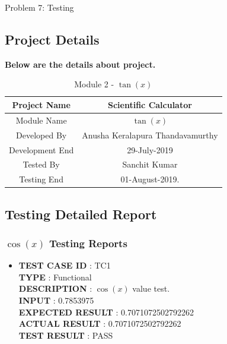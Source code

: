 \documentclass[a4paper,12pt]{article}
\begin{document}
\newpage
\begin{section}{Problem 7: Testing}

\subsection{Project Details}
\textbf{Below are the details about project.}
\renewcommand{\arraystretch}{1.5}
\begin{table}[htp]
	\centering
	\caption{Module 2 - $\tan(x)$} \vspace{0.5cm} \label{tab:definition_table} 
	\begin{tabular}{||c|c||}
		\hline \hline 
		\LARGE Project Name & \LARGE Scientific Calculator  \\ 
		\hline
		\LARGE Module Name & \LARGE $\tan(x)$  \\
		\hline
		\LARGE Developed By & \LARGE Anusha Keralapura Thandavamurthy \\
		\hline
		\LARGE Development End & \LARGE 29-July-2019 \\
		\hline  
		\LARGE Tested By & \LARGE Sanchit Kumar \\
		\hline 
		\LARGE Testing End & \LARGE 01-August-2019. \\
		\hline \hline
	\end{tabular}
\end{table}

\subsection{Testing Detailed Report}
\subsubsection{$\cos(x)$ Testing Reports}
\begin{itemize}
	
	\item \textbf{TEST CASE ID} \hspace{1.25cm} : TC1  \\
	\textbf{TYPE } \hspace{3.15cm}  : Functional\\
	\textbf{DESCRIPTION }\hspace{1.25cm} : $\cos(x)$ value test. \\
	\textbf{INPUT} \hspace{3.05cm} :  0.7853975 \\
	\textbf{EXPECTED RESULT}\hspace{0.07cm} : 0.7071072502792262 \\
	\textbf{ACTUAL RESULT} \hspace{0.6cm} : 0.7071072502792262 \\
	\textbf{TEST RESULT} \hspace{1.40cm} : PASS \\
	

\end{itemize}
\end{section}
\end{document}
